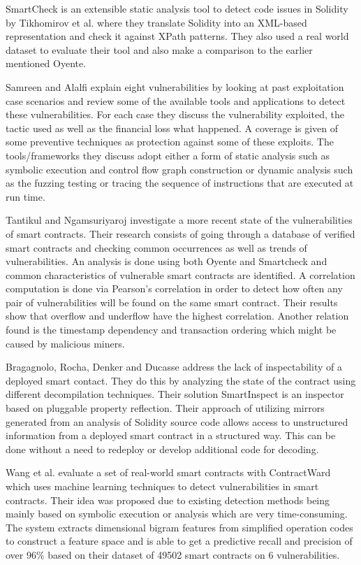 \documentclass[10pt,conference]{IEEEtran}
\begin{document}
SmartCheck is an extensible static analysis tool to detect code issues in Solidity by Tikhomirov et al.\cite{smartcheck} where they translate Solidity into an XML-based representation and check it against XPath patterns. They also used a real world dataset to evaluate their tool and also make a comparison to the earlier mentioned Oyente. 


Samreen and Alalfi  \cite{survey} explain eight vulnerabilities by looking at past exploitation case scenarios and review some of the available tools and applications to detect these vulnerabilities. For each case they discuss the vulnerability exploited, the tactic used as well as the financial loss what happened. A coverage is given of some preventive techniques as protection against some of these exploits. The tools/frameworks they discuss adopt either a form of static analysis such as symbolic execution and control flow graph construction or dynamic analysis such as the fuzzing testing or tracing the sequence of instructions that are executed at run time. 

Tantikul and Ngamsuriyaroj \cite{icissp20} investigate a more recent state of the vulnerabilities of smart contracts. Their research consists of going through a database of verified smart contracts and checking common occurrences as well as trends of vulnerabilities. An analysis is done using both Oyente and Smartcheck and common characteristics of vulnerable smart contracts are identified. A correlation computation is done via Pearson's correlation in order to detect how often any pair of vulnerabilities will be found on the same smart contract. Their results show that overflow and underflow have the highest correlation. Another relation found is the timestamp dependency and transaction ordering which might be caused by malicious miners.  

Bragagnolo, Rocha, Denker and Ducasse \cite{rocha} address the lack of inspectability of a deployed smart contact. They do this by analyzing the state of the contract using different decompilation techniques. Their solution SmartInspect is an inspector based on pluggable property reflection. Their approach of utilizing mirrors generated from an analysis of Solidity source code allows access to unstructured information from a deployed smart contract in a structured way. This can be done without a need to redeploy or develop additional code for decoding. 

Wang et al. \cite{contractward} evaluate a set of real-world smart contracts with ContractWard which uses machine learning techniques to detect vulnerabilities in smart contracts. Their idea was proposed due to existing detection methods being mainly based on symbolic execution or analysis which are very time-consuming. The system extracts dimensional bigram features from simplified operation codes to construct a feature space and is able to get a predictive recall and precision of over 96\% based on their dataset of 49502 smart contracts on 6 vulnerabilities.
\end{document}
